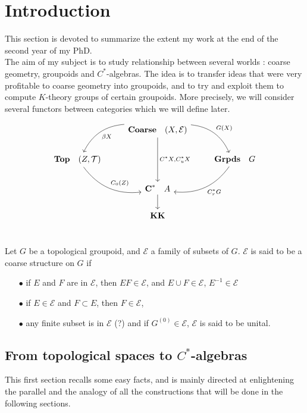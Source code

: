 \section{Introduction}

This section is devoted to summarize the extent my work at the end of the second year of my PhD.\\

The aim of my subject is to study relationship between several worlds : coarse geometry, groupoids and $C^*$-algebras. The idea is to transfer ideas that were very profitable to coarse geometry into groupoids, and to try and exploit them to compute $K$-theory groups of certain groupoids. More precisely, we will consider several functors between categories which we will define later.

\[\begin{tikzcd}
\  & \textbf{Coarse} \quad (X,\mathcal E) \arrow[bend left]{dr}{G(X)} \arrow[bend right]{dl}{\beta X} \arrow{dd}{C^*X,C^*_uX}& \ \\
 \textbf{Top} \quad (Z,\mathcal T) \arrow[bend right]{dr}{C_0(Z)} & \  & \textbf{Grpds}\quad G \arrow[bend left]{dl}{C^*_r G} \\
 \ & \textbf{C}^* \quad A \arrow{d} & \ \\
\ & \textbf{KK} & \ \\
\end{tikzcd}\] 

\begin{definition}
Let $G$ be a topological groupoid, and $\mathcal E$ a family of subsets of $G$. $\mathcal E$ is said to be a coarse structure on $G$ if 
\begin{itemize}
\item[$\bullet$] if $E$ and $F$ are in $\mathcal E$, then $EF\in \mathcal E$, and $E\cup F\in \mathcal E$, $E^{-1}\in \mathcal E$
\item[$\bullet$] if $E\in \mathcal E$ and $F\subset E$, then $F\in \mathcal E$,
\item[$\bullet$] any finite subset is in $\mathcal E$ (?) and if $G^{(0)}\in \mathcal E$, $\mathcal E$ is said to be unital.
\end{itemize}
\end{definition}

\subsection{From topological spaces to $C^*$-algebras}

This first section recalls some easy facts, and is mainly directed at enlightening the parallel and the analogy of all the constructions that will be done in the following sections.\\

